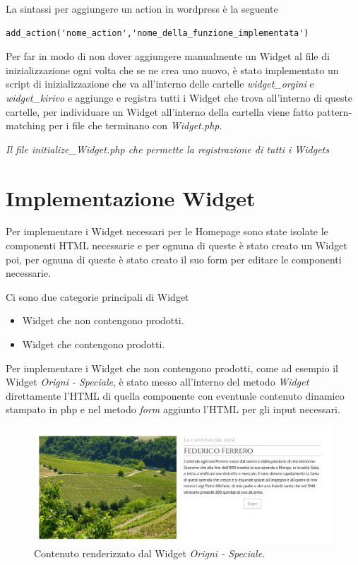 La sintassi per aggiungere un action in wordpress è la seguente
\begin{verbatim}
add_action('nome_action','nome_della_funzione_implementata')
\end{verbatim}

Per far in modo di non dover aggiungere manualmente un Widget al file di inizializzazione ogni volta che se ne crea uno nuovo, è
stato implementato un script di inizializzazione che va all'interno delle cartelle \emph{widget\_orgini} e \emph{widget\_kirivo} e aggiunge e registra tutti
i Widget che trova all'interno di queste cartelle, per individuare un Widget all'interno della cartella viene fatto pattern-matching per i file che terminano con \emph{Widget.php}.


\emph{Il file initialize\_Widget.php che permette la registrazione di tutti i Widgets}

\section{Implementazione Widget}
Per implementare i Widget necessari per le Homepage sono state isolate le componenti HTML necessarie e per ognuna
di queste è stato creato un Widget poi, per ognuna di queste è stato creato il suo form per editare le componenti necessarie.

Ci sono due categorie principali di Widget
\begin{itemize}
\item Widget che non contengono prodotti.
\item Widget che contengono prodotti.
\end{itemize}

Per implementare i Widget che non contengono prodotti, come ad esempio il Widget \emph{Origni - Speciale}, è stato messo all'interno del metodo \emph{Widget} direttamente
l'HTML di quella componente con eventuale contenuto dinamico stampato in php e nel metodo \emph{form} aggiunto l'HTML per gli input necessari.

\begin{figure}
  \includegraphics[width=\textwidth]{figure/ospec.png}
  \caption{Contenuto renderizzato dal Widget \emph{Origni - Speciale}.}
  \label{fig:ospec1}
\end{figure}

